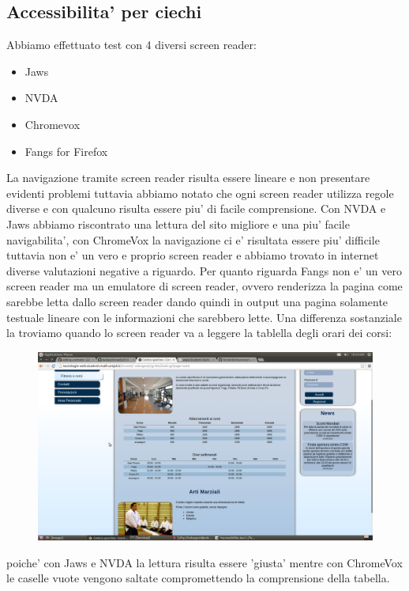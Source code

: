 \subsection{Accessibilita' per ciechi}
Abbiamo effettuato test con 4 diversi screen reader:
\begin{itemize}
	\item Jaws
	\item NVDA
	\item Chromevox
	\item Fangs for Firefox
\end{itemize}
La navigazione tramite screen reader risulta essere lineare e non presentare evidenti problemi tuttavia abbiamo notato che ogni screen reader utilizza regole diverse e con qualcuno risulta essere piu' di facile comprensione.
Con NVDA e Jaws abbiamo riscontrato una lettura del sito migliore e una piu' facile navigabilita', con ChromeVox la navigazione ci e' risultata essere piu' difficile tuttavia non e' un vero e proprio screen reader e abbiamo trovato in internet diverse valutazioni negative a riguardo.
Per quanto riguarda Fangs non e' un vero screen reader ma un emulatore di screen reader, ovvero renderizza la pagina come sarebbe letta dallo screen reader dando quindi in output una pagina solamente testuale lineare con le informazioni che sarebbero lette.
Una differenza sostanziale la troviamo quando lo screen reader va a leggere la tablella degli orari dei corsi:\newline
\begin{figure}[H]
	\includegraphics[height=0.4\textwidth]{images/tabella_corsi.png} 
\end{figure}
poiche' con Jaws e NVDA la lettura risulta essere 'giusta' mentre con ChromeVox le caselle vuote vengono saltate compromettendo la comprensione della tabella.
